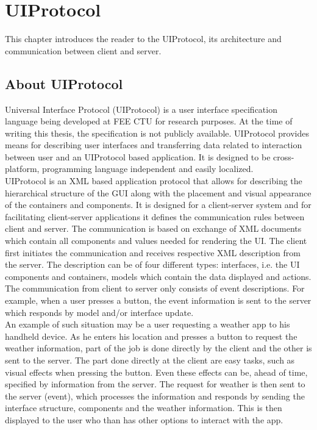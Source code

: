 \section{UIProtocol}
This chapter introduces the reader to the UIProtocol, its architecture and communication between client and server.

\subsection{About UIProtocol}
Universal Interface Protocol (UIProtocol) is a user interface specification language \cite{uip} being developed at FEE CTU for research purposes. At the time of writing this thesis, the specification is not publicly available. UIProtocol provides means for describing user interfaces and transferring data related to interaction between user and an UIProtocol based application. It is designed to be cross-platform, programming language independent and easily localized.\\
UIProtocol is an XML based application protocol that allows for describing the hierarchical structure of the GUI along with the placement and visual appearance of the containers and components. It is designed for a client-server system and for facilitating client-server applications it defines the communication rules between client and server. The communication  is based on exchange of XML documents which contain all components and values needed for rendering the UI. The client first initiates the communication and receives respective XML description from the server. The description can be of four different types: interfaces, i.e. the UI components and containers, models which contain the data displayed and actions. The communication from client to server only consists of event descriptions. For example, when a user presses a button, the event information is sent to the server which responds by model and/or interface update.\\
An example of such situation may be a user requesting a weather app to his handheld device. As he enters his location and presses a button to request the weather information, part of the job is done directly by the client and the other is sent to the server. The part done directly at the client are easy tasks, such as visual effects when pressing the button. Even these effects can be, ahead of time, specified by information from the server. The request for weather is then sent to the server (event), which processes the information and responds by sending the interface structure, components and the weather information. This is then displayed to the user who than has other options to interact with the app.

